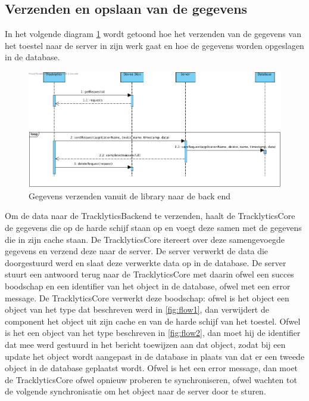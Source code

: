 \subsection{Verzenden en opslaan van de gegevens} \label{sec:VerzendenEnOpslaanVanGegevens}
In het volgende diagram \ref{fig:flow3} wordt getoond hoe het verzenden van de gegevens van het toestel naar de server in zijn werk gaat en hoe de gegevens worden opgeslagen in de database. \\
\begin{figure}[!h]
  \centering
  \includegraphics[scale=0.4]{Afbeeldingen/Architectuur/FlowDiagram3}
  \caption{Gegevens verzenden vanuit de library naar de back end}
  \label{fig:flow3}
\end{figure}

Om de data naar de TracklyticsBackend te verzenden, haalt de TracklyticsCore de gegevens die op de harde schijf staan op en voegt deze samen met de gegevens die in zijn cache staan. De TracklyticsCore itereert over deze samengevoegde gegevens en verzend deze naar de server. De server verwerkt de data die doorgestuurd werd en slaat deze verwerkte data op in de database. De server stuurt een antwoord terug naar de TracklyticsCore met daarin ofwel een succes boodschap en een identifier van het object in de database, ofwel met een error message. De TracklyticsCore verwerkt deze boodschap: ofwel is het object een object van het type dat beschreven werd in \ref{fig:flow1}, dan verwijdert de component het object uit zijn cache en van de harde schijf van het toestel. Ofwel is het een object van het type beschreven in \ref{fig:flow2}, dan moet hij de identifier dat mee werd gestuurd in het bericht toewijzen aan dat object, zodat bij een update het object wordt aangepast in de database in plaats van dat er een tweede object in de database geplaatst wordt. Ofwel is het een error message, dan moet de TracklyticsCore ofwel opnieuw proberen te synchroniseren, ofwel wachten tot de volgende synchronisatie om het object naar de server door te sturen.\\


